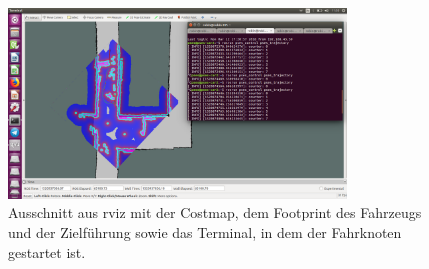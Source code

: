 \begin{figure}[h]
	\centering
	\includegraphics[width=0.8\textwidth,trim=2.4cm 0cm 0cm 1cm,clip]{pics/rviz.png}
	\caption{Ausschnitt aus rviz mit der Costmap, dem Footprint des Fahrzeugs und der Zielf\"uhrung sowie das Terminal, in dem der Fahrknoten gestartet ist.}
	\label{fig:rviz}
\end{figure}

